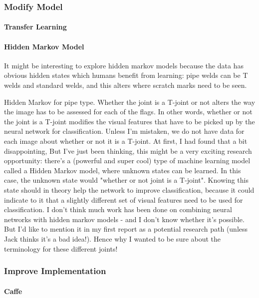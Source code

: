 \documentclass[a4paper,11pt]{article}
\begin{document}
\subsubsection{Modify Model}

\paragraph{Transfer Learning}

\paragraph{Hidden Markov Model}

It might be interesting to explore hidden markov models because the data has obvious hidden states which humans benefit from learning: pipe welds can be T welds and standard welds, and this alters where scratch marks need to be seen.

Hidden Markov for pipe type. Whether the joint is a T-joint or not alters the way the image has to be assessed for each of the flags. In other words, whether or not the joint is a T-joint modifies the visual features that have to be picked up by the neural network for classification.
Unless I'm mistaken, we do not have data for each image about whether or not it is a T-joint.
At first, I had found that a bit disappointing, But I've just been thinking, this might be a very exciting research opportunity: there's a (powerful and super cool) type of machine learning model called a Hidden Markov model, where unknown states can be learned. In this case, the unknown state would "whether or not joint is a T-joint". Knowing this state should in theory help the network to improve classification, because it could indicate to it that a slightly different set of visual features need to be used for classification.
I don't think much work has been done on combining neural networks with hidden markov models - and I don't know whether it's possible. But I'd like to mention it in my first report as a potential research path (unless Jack thinks it's a bad idea!). Hence why I wanted to be sure about the terminology for these different joints!


\subsubsection{Improve Implementation}

\paragraph{Caffe}
\end{document}
